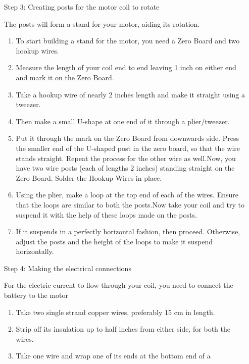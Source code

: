 \begin{enumerate}
    \item[Step 3:] Creating posts for the motor coil to rotate
        \item[] The posts will form a stand for your motor, aiding its rotation.
        \begin{enumerate}
            \item To start building a stand for the motor, you need a Zero Board
            and two hookup wires.
            \item Measure the length of your coil end to end leaving 1 inch on
            either end and mark it on the Zero Board.
            \item Take a hookup wire of nearly 2 inches length and make it straight
            using a tweezer.
            \item Then make a small U-shape at one end of it through a plier/tweezer.
            \item Put it through the mark on the Zero Board from downwards side.
            Press the smaller end of the U-shaped post in the zero board, so
            that the wire stands straight. Repeat the process for the other wire
            as well.Now, you have two wire posts (each of lengths 2 inches)
            standing straight on the Zero Board. Solder the Hookup Wires in
            place.
            \item Using the plier, make a loop at the top end of each of the wires.
            Ensure that the loops are similar to both the posts.Now take your
            coil and try to suspend it with the help of these loops made on the
            posts.
            \item If it suspends in a perfectly horizontal fashion, then proceed.
            Otherwise, adjust the posts and the height of the loops to make it
            suspend horizontally.
        \end{enumerate}
    \item[Step 4:] Making the electrical connections
        \item[] For the electric current to flow through your coil, you need to connect
            the battery to the motor
        \begin{enumerate}
            \item Take two single strand copper wires, preferably 15 cm in length.
            \item Strip off its insulation up to half inches from either side, for both
            the wires.
            \item Take one wire and wrap one of its ends at the bottom end of a

\end{enumerate}
\end{enumerate}
